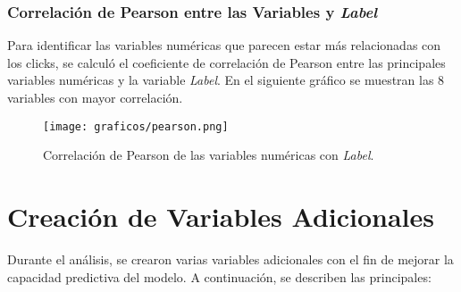 \documentclass[a4paper,12pt]{article}
\begin{document}
\subsubsection{Correlación de Pearson entre las Variables y \textit{Label}}

Para identificar las variables numéricas que parecen estar más relacionadas con los clicks, se calculó el coeficiente de correlación de Pearson entre las principales variables numéricas y la variable \textit{Label}. En el siguiente gráfico se muestran las 8 variables con mayor correlación.

\begin{figure}[H]
    \centering
    \texttt{[image: graficos/pearson.png]}
    \caption{Correlación de Pearson de las variables numéricas con \textit{Label}.}
\end{figure}

\section{Creación de Variables Adicionales}

Durante el análisis, se crearon varias variables adicionales con el fin de mejorar la capacidad predictiva del modelo. A continuación, se describen las principales:
\end{document}
